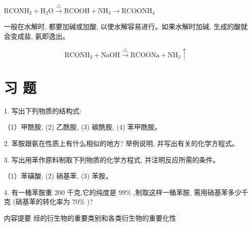 \documentclass[10pt]{article}
\newcommand{\customfootnote}[1]{
  \let\thefootnote\relax\footnotetext{#1}
}
\begin{document}
\({\mathrm{{RCONH}}}_{2} + {\mathrm{H}}_{2}\mathrm{O}\overset{\bigtriangleup }{ \rightarrow }\mathrm{{RCOOH}} + {\mathrm{{NH}}}_{3} \rightarrow {\mathrm{{RCOONH}}}_{4}\)

\customfootnote{

① 酰音 xian。

}

一般在水解时, 都要加碱或加酸, 以使水解容易进行。如果水解时加碱, 生成的酸就会变成盐, 氨即逸出。

\[
{\mathrm{{RCONH}}}_{2} + \mathrm{{NaOH}}\overset{\bigtriangleup }{ \rightarrow }\mathrm{{RCOONa}} + {\mathrm{{NH}}}_{3} \uparrow
\]

\section*{习 题}

1. 写出下列物质的结构式:

（1）甲酰胺, (2) 乙酰胺, (3) 碳酰胺, (4) 苯甲酰胺。

2. 苯胺跟氨在性质上有什么相似的地方? 举例说明, 并写出有关的化学方程式。

3. 写出用苯作原料制取下列物质的化学方程式, 并注明反应所需的条件。

（1）苯磺酸, (2) 硝基苯, (3) 苯胺。

4. 有一桶苯胺重 200 千克,它的纯度是 \({99}\%\) ,制取这样一桶苯胺, 需用硝基苯多少千克 (硝基苯的转化率为 \({70}\%\) )?

内容提要 烃的衍生物的重要类别和各类衍生物的重要化性

\begin{center}
\end{center}
\end{document}
